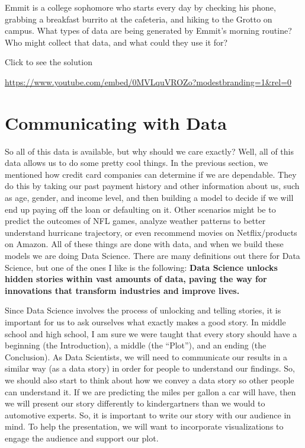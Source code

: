 \documentclass[
  letterpaper,
  DIV=11,
  numbers=noendperiod]{scrreprt}
\begin{document}
\begin{tcolorbox}[enhanced jigsaw, leftrule=.75mm, arc=.35mm, coltitle=black, rightrule=.15mm, bottomrule=.15mm, toprule=.15mm, left=2mm, colbacktitle=quarto-callout-tip-color!10!white, title=\textcolor{quarto-callout-tip-color}{\faLightbulb}\hspace{0.5em}{Try it Out}, toptitle=1mm, breakable, colframe=quarto-callout-tip-color-frame, bottomtitle=1mm, titlerule=0mm, colback=white, opacityback=0, opacitybacktitle=0.6]

Emmit is a college sophomore who starts every day by checking his phone,
grabbing a breakfast burrito at the cafeteria, and hiking to the Grotto
on campus. What types of data are being generated by Emmit's morning
routine? Who might collect that data, and what could they use it for?

Click to see the solution

\url{https://www.youtube.com/embed/0MVLquVROZo?modestbranding=1&rel=0}

\end{tcolorbox}

\section{Communicating with Data}\label{communicating-with-data}

So all of this data is available, but why should we care exactly? Well,
all of this data allows us to do some pretty cool things. In the
previous section, we mentioned how credit card companies can determine
if we are dependable. They do this by taking our past payment history
and other information about us, such as age, gender, and income level,
and then building a model to decide if we will end up paying off the
loan or defaulting on it. Other scenarios might be to predict the
outcomes of NFL games, analyze weather patterns to better understand
hurricane trajectory, or even recommend movies on Netflix/products on
Amazon. All of these things are done with data, and when we build these
models we are doing Data Science. There are many definitions out there
for Data Science, but one of the ones I like is the following:
\textbf{Data Science unlocks hidden stories within vast amounts of data,
paving the way for innovations that transform industries and improve
lives.}

Since Data Science involves the process of unlocking and telling
stories, it is important for us to ask ourselves what exactly makes a
good story. In middle school and high school, I am sure we were taught
that every story should have a beginning (the Introduction), a middle
(the ``Plot''), and an ending (the Conclusion). As Data Scientists, we
will need to communicate our results in a similar way (as a data story)
in order for people to understand our findings. So, we should also start
to think about how we convey a data story so other people can understand
it. If we are predicting the miles per gallon a car will have, then we
will present our story differently to kindergartners than we would to
automotive experts. So, it is important to write our story with our
audience in mind. To help the presentation, we will want to incorporate
visualizations to engage the audience and support our plot.
\end{document}

